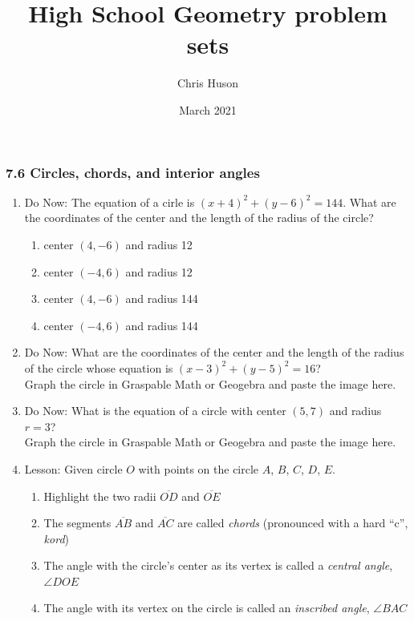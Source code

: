 \documentclass[12pt, twoside]{article}
\title{High School Geometry problem sets}
\author{Chris Huson}
\date{March 2021}
\begin{document}
\subsubsection*{7.6 Circles, chords, and interior angles}
\begin{enumerate}
\item Do Now: The equation of a cirle is $(x+4)^2+(y-6)^2=144$. What are the coordinates of the center and the length of the radius of the circle?
  \begin{enumerate}
    \item center $(4,-6)$ and radius 12
    \item center $(-4,6)$ and radius 12
    \item center $(4,-6)$ and radius 144
    \item center $(-4,6)$ and radius 144
  \end{enumerate}

\newpage
\item Do Now: What are the coordinates of the center and the length of the radius of the circle whose equation is $(x-3)^2+(y-5)^2=16$?\\[0.5cm]
Graph the circle in Graspable Math or Geogebra and paste the image here.

\newpage
\item Do Now: What is the equation of a circle with center $(5,7)$ and radius $r=3$?\\[0.5cm]
Graph the circle in Graspable Math or Geogebra and paste the image here.

\newpage
\item Lesson: Given circle $O$ with points on the circle $A$, $B$, $C$, $D$, $E$.
    \begin{multicols}{2}
    \raggedcolumns
    \begin{enumerate}[itemsep=0.5cm]
      \item Highlight the two radii $\overline{OD}$ and $\overline{OE}$
      \item The segments $\overline{AB}$ and $\overline{AC}$ are called \emph{chords} (pronounced with a hard ``c'', \emph{kord})
      \item The angle with the circle's center as its vertex is called a \emph{central angle}, $\angle DOE$
      \item The angle with its vertex on the circle is called an \emph{inscribed angle}, $\angle BAC$
      

\end{enumerate}
\end{multicols}
\end{enumerate}
\end{document}
